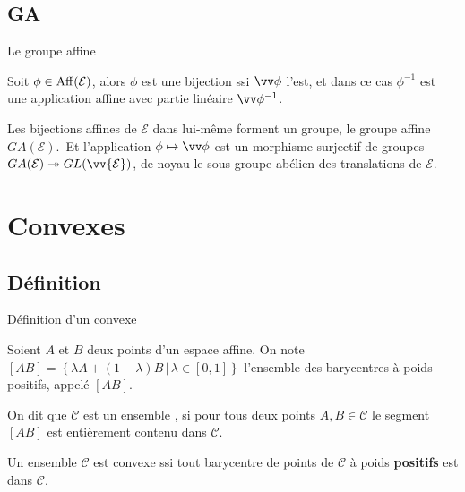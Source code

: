 \documentclass[
bigger]{m53beamer}
\begin{document}
\subsection{GA}
  \begin{frame}{Le groupe affine}
    \begin{proposition}
      Soit $\phi\in\operatorname{Aff}(\mathcal{E})$, alors $\phi$ est une bijection ssi $\vv\phi$ l'est, et dans ce cas $\phi^{-1}$ est une application affine avec partie linéaire $\vv\phi^{-1}$.
    \end{proposition}\pause
    \begin{proposition}
      Les bijections affines de $\mathcal{E}$ dans lui-même forment un groupe, le groupe affine $GA(\mathcal{E})$.\pause\ Et l'application $\phi\mapsto\vv\phi$ est un morphisme surjectif de groupes $GA(\mathcal{E})\twoheadrightarrow GL(\vv{\mathcal{E}})$\pause, de noyau le sous-groupe abélien des translations de $\mathcal{E}$.
    \end{proposition}
  \end{frame}
\section{Convexes}
\subsection{Définition}
\begin{frame}{Définition d'un convexe}
  \begin{definition}
    Soient $A$ et $B$ deux points d'un espace affine. On note $[AB]=\left\{\lambda A + (1-\lambda)B\,|\, \lambda \in [0,1]\right\}$ l'ensemble des barycentres à poids positifs, appelé  $[AB]$.
  \end{definition}\pause
  \begin{definition}
    On dit que $\mathcal{C}$ est un ensemble , si pour tous deux points $A,B \in \mathcal{C}$ le segment $[AB]$ est entièrement contenu dans $\mathcal{C}$.
  \end{definition}\pause
  \begin{proposition}
    Un ensemble $\mathcal{C}$ est convexe ssi tout barycentre de points de $\mathcal{C}$ à poids \textbf{positifs} est dans $\mathcal{C}$.
  \end{proposition}
\end{frame}
\end{document}
